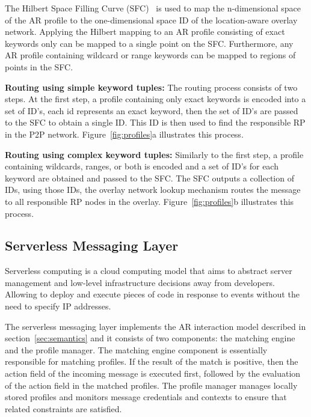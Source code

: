 The Hilbert Space Filling Curve (SFC)~\cite{SFC} is used to map the n-dimensional space of the AR profile to the one-dimensional space ID of the location-aware overlay network. Applying the Hilbert mapping to an AR profile consisting of exact keywords only can be mapped to a single point on the SFC. Furthermore, any AR profile containing wildcard or range keywords can be mapped to regions of points in the SFC.

\textbf{Routing using simple keyword tuples:} The routing process consists of two steps. At the first step, a profile containing only exact keywords is 
encoded into a set of ID's, each id represents an exact keyword, then the set of ID's are passed to the SFC to obtain a single ID. This ID is then  used to find the responsible RP in the P2P network. Figure~\ref{fig:profiles}a illustrates this process. \vspace{1ex} 

\textbf{Routing using complex keyword tuples:} Similarly to the first step, a profile containing wildcards, ranges, or both is encoded and a set of ID's for each keyword are obtained and passed to the SFC. The SFC outputs a collection of IDs, using those IDs, the overlay network lookup mechanism routes the message to all responsible RP nodes in the overlay. Figure~\ref{fig:profiles}b illustrates this process.


\subsection{Serverless Messaging Layer}\label{sec:serverless}

Serverless computing is a cloud computing model that aims to abstract server management and low-level infrastructure decisions away from developers. Allowing to deploy and execute pieces of code in response to events without the need to specify IP addresses.

The serverless messaging layer implements the AR interaction model described in section~\ref{sec:semantics} and it consists of two components: the matching engine and the profile manager. The matching engine component is essentially responsible for matching profiles. If the result of the match is positive, then the action field of the incoming message is executed first, followed by the evaluation of the action field in the matched profiles. The profile manager manages locally stored profiles and monitors message credentials and contexts to ensure that related constraints are satisfied.

